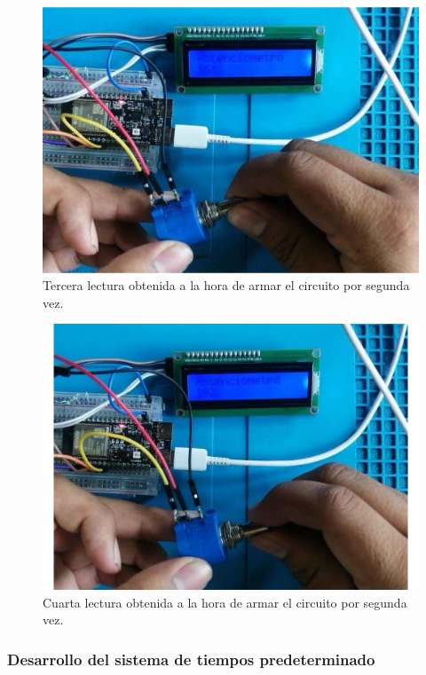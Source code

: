     \begin{figure}[H]
        \centering
        \includegraphics[trim = {50mm 20mm 0mm 0mm},clip,scale=0.3]{19/Img/evidenciaCambio7.pdf}
        \caption{Tercera lectura obtenida a la hora de armar el circuito por segunda vez.}
        \label{fig:evidenciaCambio7}
    \end{figure}
    \begin{figure}[H]
        \centering
        \includegraphics[trim = {50mm 20mm 0mm 0mm},clip,scale=0.3]{19/Img/evidenciaCambio8.pdf}
        \caption{Cuarta lectura obtenida a la hora de armar el circuito por segunda vez.}
        \label{fig:evidenciaCambio8}
    \end{figure}

    \subsubsection{Desarrollo del sistema de tiempos predeterminado}

